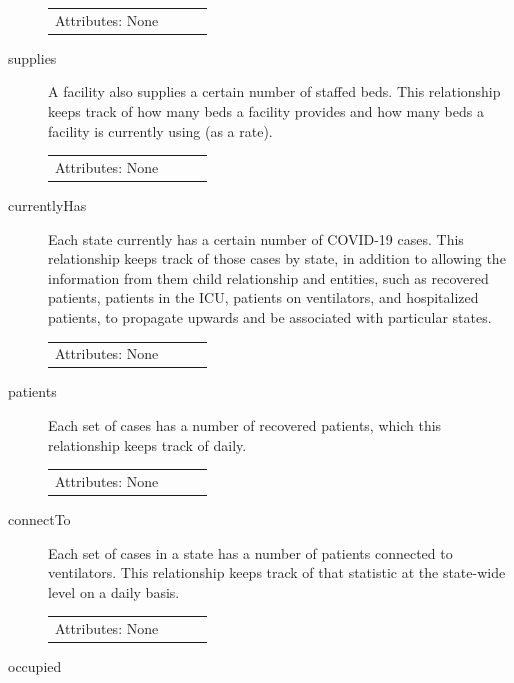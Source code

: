 \documentclass[11pt]{article}
\begin{document}
\begin{description}
\begin{tabular}{lllc}
     Attributes: None \\
\end{tabular}

\item [supplies]

\noindent
A facility also supplies a certain number of staffed beds. This relationship keeps track of how many beds a facility provides and how many beds a facility is currently using (as a rate).

\begin{tabular}{lllc}
    Attributes: None \\
\end{tabular}

\item [currentlyHas]

\noindent
Each state currently has a certain number of COVID-19 cases. This relationship keeps track of those cases by state, in addition to allowing the information from them child relationship and entities, such as recovered patients, patients in the ICU, patients on ventilators, and hospitalized patients, to propagate upwards and be associated with particular states.

\begin{tabular}{lllc}
    Attributes: None \\
\end{tabular}

\item [patients]

\noindent
Each set of cases has a number of recovered patients, which this relationship keeps track of daily.

\begin{tabular}{lllc}
    Attributes: None \\
\end{tabular}

\item [connectTo]

\noindent
Each set of cases in a state has a number of patients connected to ventilators. This relationship keeps track of that statistic at the state-wide level on a daily basis.

\begin{tabular}{lllc}
    Attributes: None \\
\end{tabular}

\item [occupied]


\end{description}
\end{document}
